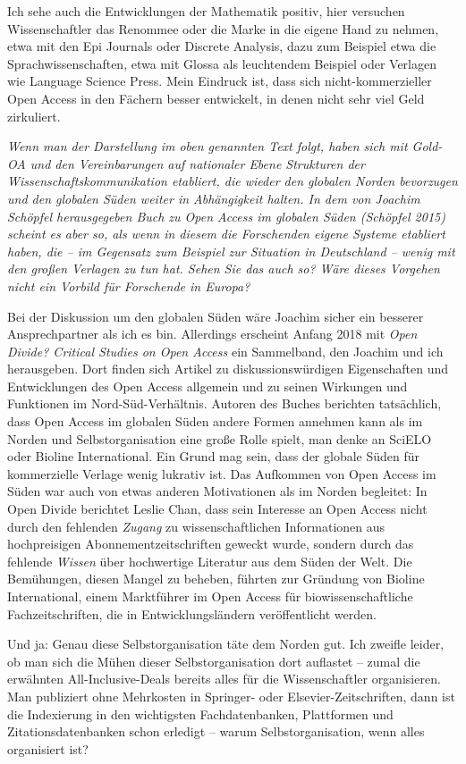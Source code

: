 \documentclass[a4paper,
fontsize=11pt,
oneside,
numbers=noperiodatend,
parskip=half-,
bibliography=totoc,
final
]{scrartcl}
\begin{document}
Ich sehe auch die Entwicklungen der Mathematik positiv, hier versuchen
Wissenschaftler das Renommee oder die Marke in die eigene Hand zu
nehmen, etwa mit den Epi Journals oder Discrete Analysis, dazu zum
Beispiel etwa die Sprachwissenschaften, etwa mit Glossa als leuchtendem
Beispiel oder Verlagen wie Language Science Press. Mein Eindruck ist,
dass sich nicht-kommerzieller Open Access in den Fächern besser
entwickelt, in denen nicht sehr viel Geld zirkuliert.

\emph{Wenn man der Darstellung im oben genannten Text folgt, haben sich
mit Gold-OA und den Vereinbarungen auf nationaler Ebene Strukturen der
Wissenschaftskommunikation etabliert, die wieder den globalen Norden
bevorzugen und den globalen Süden weiter in Abhängigkeit halten. In dem
von Joachim Schöpfel herausgegeben Buch zu Open Access im globalen Süden
(Schöpfel 2015) scheint es aber so, als wenn in diesem die Forschenden
eigene Systeme etabliert haben, die -- im Gegensatz zum Beispiel zur
Situation in Deutschland -- wenig mit den großen Verlagen zu tun hat.
Sehen Sie das auch so? Wäre dieses Vorgehen nicht ein Vorbild für
Forschende in Europa?}

Bei der Diskussion um den globalen Süden wäre Joachim sicher ein
besserer Ansprechpartner als ich es bin. Allerdings erscheint Anfang
2018 mit \emph{Open Divide? Critical Studies on Open Access} ein
Sammelband, den Joachim und ich herausgeben. Dort finden sich Artikel zu
diskussionswürdigen Eigenschaften und Entwicklungen des Open Access
allgemein und zu seinen Wirkungen und Funktionen im Nord-Süd-Verhältnis.
Autoren des Buches berichten tatsächlich, dass Open Access im globalen
Süden andere Formen annehmen kann als im Norden und Selbstorganisation
eine große Rolle spielt, man denke an SciELO oder Bioline International.
Ein Grund mag sein, dass der globale Süden für kommerzielle Verlage
wenig lukrativ ist. Das Aufkommen von Open Access im Süden war auch von
etwas anderen Motivationen als im Norden begleitet: In Open Divide
berichtet Leslie Chan, dass sein Interesse an Open Access nicht durch
den fehlenden \emph{Zugang} zu wissenschaftlichen Informationen aus
hochpreisigen Abonnementzeitschriften geweckt wurde, sondern durch das
fehlende \emph{Wissen} über hochwertige Literatur aus dem Süden der
Welt. Die Bemühungen, diesen Mangel zu beheben, führten zur Gründung von
Bioline International, einem Marktführer im Open Access für
biowissenschaftliche Fachzeitschriften, die in Entwicklungsländern
veröffentlicht werden.

Und ja: Genau diese Selbstorganisation täte dem Norden gut. Ich zweifle
leider, ob man sich die Mühen dieser Selbstorganisation dort auflastet
-- zumal die erwähnten All-Inclusive-Deals bereits alles für die
Wissenschaftler organisieren. Man publiziert ohne Mehrkosten in
Springer- oder Elsevier-Zeitschriften, dann ist die Indexierung in den
wichtigsten Fachdatenbanken, Plattformen und Zitationsdatenbanken schon
erledigt -- warum Selbstorganisation, wenn alles organisiert ist?
\end{document}

